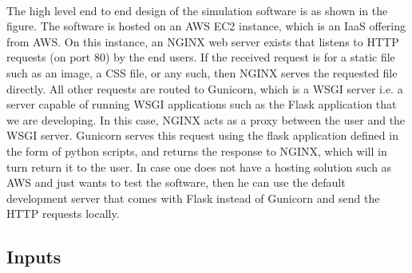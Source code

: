 \documentclass[12pt, a4paper]{extarticle}
\begin{document}
            \paragraph{} The high level end to end design of the simulation software is as shown in the figure. The software is hosted on an AWS EC2 instance, which is an IaaS offering from AWS. On this instance, an NGINX web server exists that listens to HTTP requests (on port 80) by the end users. If the received request is for a static file such as an image, a CSS file, or any such, then NGINX serves the requested file directly. All other requests are routed to Gunicorn, which is a WSGI server i.e. a server capable of running WSGI applications such as the Flask application that we are developing. In this case, NGINX acts as a proxy between the user and the WSGI server. Gunicorn serves this request using the flask application defined in the form of python scripts, and returns the response to NGINX, which will in turn return it to the user. In case one does not have a hosting solution such as AWS and just wants to test the software, then he can use the default development server that comes with Flask instead of Gunicorn and send the HTTP requests locally.
        \subsection{Inputs}
\end{document}
